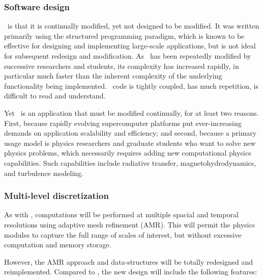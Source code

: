 \documentclass[11pt]{article}
\begin{document}
    \subsubsection{Software design}

    \enzo\ is that it is continually modified, yet not designed to be
    modified.  It was written primarily using the structured
    programming paradigm, which is known to be effective for designing
    and implementing large-scale applications, but is not ideal for
    subsequent redesign and modification.  As \enzo\ has been
    repeatedly modified by successive researchers and students, its
    complexity has increased rapidly, in particular much faster than
    the inherent complexity of the underlying functionality being
    implemented.
%
    \enzo\ code is tightly coupled, has much repetition, is difficult
    to read and understand.

    Yet \enzo\ is an application that must be modified continually,
    for at least two reasons.  First, because rapidly evolving
    supercomputer platforms put ever-increasing demands on application
    scalability and efficiency; and second, because a primary usage
    model is physics researchers and graduate students who want to
    solve new physics problems, which necessarily requires adding new
    computational physics capabilities.  Such capabilities include
    radiative transfer, magnetohydrodynamics, and turbulence modeling.

    \subsubsection{Multi-level discretization}

    As with \enzo, computations will be performed at multiple spacial
    and temporal resolutions using adaptive mesh refinement (AMR).
    This will permit the physics modules to capture the full range of
    scales of interest, but without excessive computation and memory
    storage.  

    However, the AMR approach and data-structures will be totally
    redesigned and reimplemented.  Compared to \enzo, the new design
    will include the following features:
\end{document}
